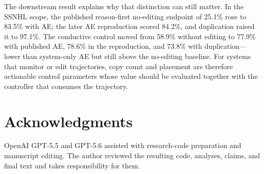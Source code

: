 \documentclass[10pt]{article}
\begin{document}
The downstream result explains why that distinction can still matter. In the SSNHL scope, the published reason-first no-editing endpoint of 25.1\% rose to 83.5\% with AE; the later AE reproduction scored 84.2\%, and duplication raised it to 97.1\%. The conductive control moved from 58.9\% without editing to 77.9\% with published AE, 78.6\% in the reproduction, and 73.8\% with duplication---lower than system-only AE but still above the no-editing baseline. For systems that monitor or edit trajectories, copy count and placement are therefore actionable control parameters whose value should be evaluated together with the controller that consumes the trajectory.

\section{Acknowledgments}
OpenAI GPT-5.5 and GPT-5.6 assisted with research-code preparation and manuscript editing. The author reviewed the resulting code, analyses, claims, and final text and takes responsibility for them.
\end{document}
